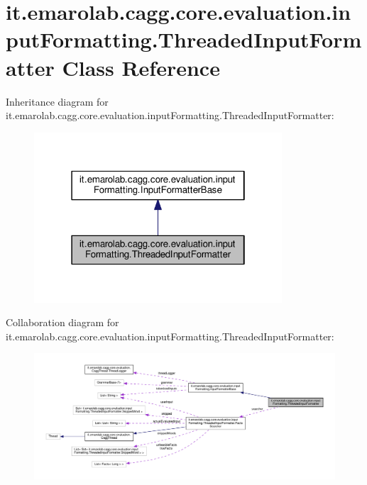 \hypertarget{classit_1_1emarolab_1_1cagg_1_1core_1_1evaluation_1_1inputFormatting_1_1ThreadedInputFormatter}{\section{it.\-emarolab.\-cagg.\-core.\-evaluation.\-input\-Formatting.\-Threaded\-Input\-Formatter Class Reference}
\label{classit_1_1emarolab_1_1cagg_1_1core_1_1evaluation_1_1inputFormatting_1_1ThreadedInputFormatter}
}


Inheritance diagram for it.\-emarolab.\-cagg.\-core.\-evaluation.\-input\-Formatting.\-Threaded\-Input\-Formatter\-:\nopagebreak
\begin{figure}[H]
\begin{center}
\leavevmode
\includegraphics[width=262pt]{classit_1_1emarolab_1_1cagg_1_1core_1_1evaluation_1_1inputFormatting_1_1ThreadedInputFormatter__inherit__graph}
\end{center}
\end{figure}


Collaboration diagram for it.\-emarolab.\-cagg.\-core.\-evaluation.\-input\-Formatting.\-Threaded\-Input\-Formatter\-:\nopagebreak
\begin{figure}[H]
\begin{center}
\leavevmode
\includegraphics[width=350pt]{classit_1_1emarolab_1_1cagg_1_1core_1_1evaluation_1_1inputFormatting_1_1ThreadedInputFormatter__coll__graph}
\end{center}
\end{figure}
